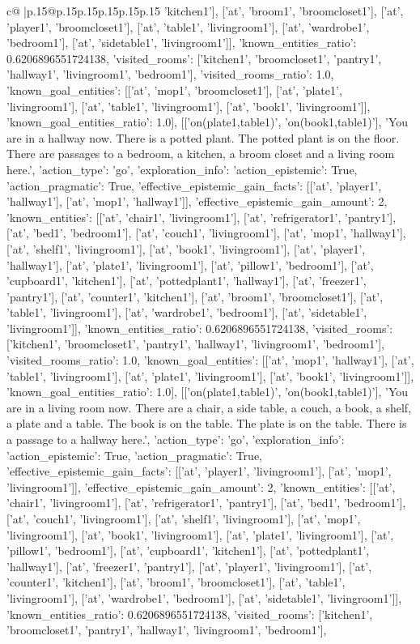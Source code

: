 \documentclass{article}
\begin{document}
{\begin{supertabular}{c@{$\;$}|p{.15\linewidth}@{}p{.15\linewidth}p{.15\linewidth}p{.15\linewidth}p{.15\linewidth}p{.15\linewidth}}
{{{'kitchen1'], ['at', 'broom1', 'broomcloset1'], ['at', 'player1', 'broomcloset1'], ['at', 'table1', 'livingroom1'], ['at', 'wardrobe1', 'bedroom1'], ['at', 'sidetable1', 'livingroom1']], 'known_entities_ratio': 0.6206896551724138, 'visited_rooms': ['kitchen1', 'broomcloset1', 'pantry1', 'hallway1', 'livingroom1', 'bedroom1'], 'visited_rooms_ratio': 1.0, 'known_goal_entities': [['at', 'mop1', 'broomcloset1'], ['at', 'plate1', 'livingroom1'], ['at', 'table1', 'livingroom1'], ['at', 'book1', 'livingroom1']], 'known_goal_entities_ratio': 1.0}}], [['on(plate1,table1)', 'on(book1,table1)'], 'You are in a hallway now. There is a potted plant. The potted plant is on the floor. There are passages to a bedroom, a kitchen, a broom closet and a living room here.', {'action_type': 'go', 'exploration_info': {'action_epistemic': True, 'action_pragmatic': True, 'effective_epistemic_gain_facts': [['at', 'player1', 'hallway1'], ['at', 'mop1', 'hallway1']], 'effective_epistemic_gain_amount': 2, 'known_entities': [['at', 'chair1', 'livingroom1'], ['at', 'refrigerator1', 'pantry1'], ['at', 'bed1', 'bedroom1'], ['at', 'couch1', 'livingroom1'], ['at', 'mop1', 'hallway1'], ['at', 'shelf1', 'livingroom1'], ['at', 'book1', 'livingroom1'], ['at', 'player1', 'hallway1'], ['at', 'plate1', 'livingroom1'], ['at', 'pillow1', 'bedroom1'], ['at', 'cupboard1', 'kitchen1'], ['at', 'pottedplant1', 'hallway1'], ['at', 'freezer1', 'pantry1'], ['at', 'counter1', 'kitchen1'], ['at', 'broom1', 'broomcloset1'], ['at', 'table1', 'livingroom1'], ['at', 'wardrobe1', 'bedroom1'], ['at', 'sidetable1', 'livingroom1']], 'known_entities_ratio': 0.6206896551724138, 'visited_rooms': ['kitchen1', 'broomcloset1', 'pantry1', 'hallway1', 'livingroom1', 'bedroom1'], 'visited_rooms_ratio': 1.0, 'known_goal_entities': [['at', 'mop1', 'hallway1'], ['at', 'table1', 'livingroom1'], ['at', 'plate1', 'livingroom1'], ['at', 'book1', 'livingroom1']], 'known_goal_entities_ratio': 1.0}}], [['on(plate1,table1)', 'on(book1,table1)'], 'You are in a living room now. There are a chair, a side table, a couch, a book, a shelf, a plate and a table. The book is on the table. The plate is on the table. There is a passage to a hallway here.', {'action_type': 'go', 'exploration_info': {'action_epistemic': True, 'action_pragmatic': True, 'effective_epistemic_gain_facts': [['at', 'player1', 'livingroom1'], ['at', 'mop1', 'livingroom1']], 'effective_epistemic_gain_amount': 2, 'known_entities': [['at', 'chair1', 'livingroom1'], ['at', 'refrigerator1', 'pantry1'], ['at', 'bed1', 'bedroom1'], ['at', 'couch1', 'livingroom1'], ['at', 'shelf1', 'livingroom1'], ['at', 'mop1', 'livingroom1'], ['at', 'book1', 'livingroom1'], ['at', 'plate1', 'livingroom1'], ['at', 'pillow1', 'bedroom1'], ['at', 'cupboard1', 'kitchen1'], ['at', 'pottedplant1', 'hallway1'], ['at', 'freezer1', 'pantry1'], ['at', 'player1', 'livingroom1'], ['at', 'counter1', 'kitchen1'], ['at', 'broom1', 'broomcloset1'], ['at', 'table1', 'livingroom1'], ['at', 'wardrobe1', 'bedroom1'], ['at', 'sidetable1', 'livingroom1']], 'known_entities_ratio': 0.6206896551724138, 'visited_rooms': ['kitchen1', 'broomcloset1', 'pantry1', 'hallway1', 'livingroom1', 'bedroom1'], }}}
\end{supertabular}}
\end{document}
